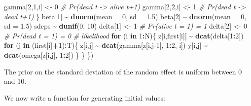 \documentclass[
  12pt,
]{krantz}
\newenvironment{Shaded}{\begin{snugshade}}{\end{snugshade}}
\newcommand{\AttributeTok}[1]{\textcolor[rgb]{0.13,0.29,0.53}{#1}}
\newcommand{\CommentTok}[1]{\textcolor[rgb]{0.56,0.35,0.01}{\textit{#1}}}
\newcommand{\ControlFlowTok}[1]{\textcolor[rgb]{0.13,0.29,0.53}{\textbf{#1}}}
\newcommand{\DecValTok}[1]{\textcolor[rgb]{0.00,0.00,0.81}{#1}}
\newcommand{\FloatTok}[1]{\textcolor[rgb]{0.00,0.00,0.81}{#1}}
\newcommand{\FunctionTok}[1]{\textcolor[rgb]{0.13,0.29,0.53}{\textbf{#1}}}
\newcommand{\NormalTok}[1]{#1}
\newcommand{\OtherTok}[1]{\textcolor[rgb]{0.56,0.35,0.01}{#1}}
\newcommand{\SpecialCharTok}[1]{\textcolor[rgb]{0.81,0.36,0.00}{\textbf{#1}}}
\begin{document}
\begin{Shaded}
\begin{Highlighting}[]
\NormalTok{    gamma[}\DecValTok{2}\NormalTok{,}\DecValTok{1}\NormalTok{,i] }\OtherTok{\textless{}{-}} \DecValTok{0}           \CommentTok{\# Pr(dead t {-}\textgreater{} alive t+1)}
\NormalTok{    gamma[}\DecValTok{2}\NormalTok{,}\DecValTok{2}\NormalTok{,i] }\OtherTok{\textless{}{-}} \DecValTok{1}           \CommentTok{\# Pr(dead t {-}\textgreater{} dead t+1)}
\NormalTok{  \}}
\NormalTok{  beta[}\DecValTok{1}\NormalTok{] }\SpecialCharTok{\textasciitilde{}} \FunctionTok{dnorm}\NormalTok{(}\AttributeTok{mean =} \DecValTok{0}\NormalTok{, }\AttributeTok{sd =} \FloatTok{1.5}\NormalTok{)}
\NormalTok{  beta[}\DecValTok{2}\NormalTok{] }\SpecialCharTok{\textasciitilde{}} \FunctionTok{dnorm}\NormalTok{(}\AttributeTok{mean =} \DecValTok{0}\NormalTok{, }\AttributeTok{sd =} \FloatTok{1.5}\NormalTok{)}
\NormalTok{  sdeps }\SpecialCharTok{\textasciitilde{}} \FunctionTok{dunif}\NormalTok{(}\DecValTok{0}\NormalTok{, }\DecValTok{10}\NormalTok{)}
\NormalTok{  delta[}\DecValTok{1}\NormalTok{] }\OtherTok{\textless{}{-}} \DecValTok{1}          \CommentTok{\# Pr(alive t = 1) = 1}
\NormalTok{  delta[}\DecValTok{2}\NormalTok{] }\OtherTok{\textless{}{-}} \DecValTok{0}          \CommentTok{\# Pr(dead t = 1) = 0}
  \CommentTok{\# likelihood}
  \ControlFlowTok{for}\NormalTok{ (i }\ControlFlowTok{in} \DecValTok{1}\SpecialCharTok{:}\NormalTok{N)\{}
\NormalTok{    z[i,first[i]] }\SpecialCharTok{\textasciitilde{}} \FunctionTok{dcat}\NormalTok{(delta[}\DecValTok{1}\SpecialCharTok{:}\DecValTok{2}\NormalTok{])}
    \ControlFlowTok{for}\NormalTok{ (j }\ControlFlowTok{in}\NormalTok{ (first[i]}\SpecialCharTok{+}\DecValTok{1}\NormalTok{)}\SpecialCharTok{:}\NormalTok{T)\{}
\NormalTok{      z[i,j] }\SpecialCharTok{\textasciitilde{}} \FunctionTok{dcat}\NormalTok{(gamma[z[i,j}\DecValTok{{-}1}\NormalTok{], }\DecValTok{1}\SpecialCharTok{:}\DecValTok{2}\NormalTok{, i])}
\NormalTok{      y[i,j] }\SpecialCharTok{\textasciitilde{}} \FunctionTok{dcat}\NormalTok{(omega[z[i,j], }\DecValTok{1}\SpecialCharTok{:}\DecValTok{2}\NormalTok{])}
\NormalTok{    \}}
\NormalTok{  \}}
\NormalTok{\})}
\end{Highlighting}
\end{Shaded}

The prior on the standard deviation of the random effect is uniform between 0 and 10.

We now write a function for generating initial values:
\end{document}
